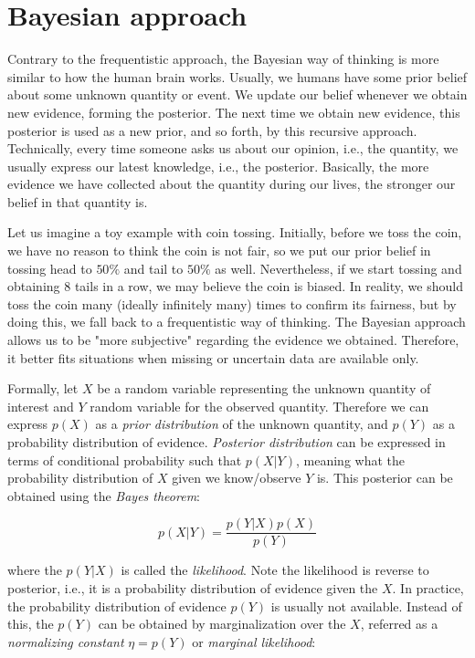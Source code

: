 \documentclass[
  digital, %
  oneside, %
  lof,     %
  lot,     %
]{fithesis4}
\begin{document}
\section{Bayesian approach}

Contrary to the frequentistic approach, the Bayesian way of thinking is more similar to how the human brain works. 
Usually, we humans have some prior belief about some unknown quantity or event. We update our belief whenever we obtain new evidence, forming the posterior.
The next time we obtain new evidence, this posterior is used as a new prior, and so forth, by this recursive approach.
Technically, every time someone asks us about our opinion, i.e., the quantity, we usually express our latest knowledge, i.e., the posterior.
Basically, the more evidence we have collected about the quantity during our lives, the stronger our belief in that quantity is.

Let us imagine a toy example with coin tossing. 
Initially, before we toss the coin, we have no reason to think the coin is not fair, so we put our prior belief in tossing head to $50\%$ and tail to $50\%$ as well. 
Nevertheless, if we start tossing and obtaining 8 tails in a row, we may believe the coin is biased. 
In reality, we should toss the coin many (ideally infinitely many) times to confirm its fairness, but by doing this, we fall back to a frequentistic way of thinking. 
The Bayesian approach allows us to be "more subjective" regarding the evidence we obtained. 
Therefore, it better fits situations when missing or uncertain data are available only.

Formally, let $X$ be a random variable representing the unknown quantity of interest and $Y$ random variable for the observed quantity.
Therefore we can express $p(X)$ as a \textit{prior distribution} of the unknown quantity, and $p(Y)$ as a probability distribution of evidence.
\textit{Posterior distribution} can be expressed in terms of conditional probability such that $p(X | Y)$, meaning what the probability distribution of $X$ given we know/observe $Y$ is. 
This posterior can be obtained using the \textit{Bayes theorem}:

\begin{equation}\label{eq:bayes-theorem}
p( X | Y ) = \frac{p( Y | X ) p(X)}{p(Y)}
\end{equation}

where the $p( Y | X )$ is called the \textit{likelihood}.
Note the likelihood is reverse to posterior, i.e., it is a probability distribution of evidence given the $X$.
In practice, the probability distribution of evidence $p(Y)$ is usually not available. 
Instead of this, the $p(Y)$ can be obtained by marginalization over the $X$, referred as a \textit{normalizing constant} $\eta = p(Y)$ or \textit{marginal likelihood}:
\end{document}
